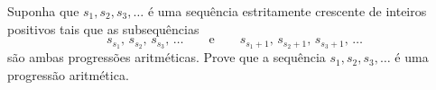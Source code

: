 Suponha que $s_1, s_2, s_3, \ldots$ é uma sequência estritamente crescente de inteiros positivos tais que as subsequências \[s_{s_1},\, s_{s_2},\, s_{s_3},\, \ldots\qquad\text{e}\qquad s_{s_1+1},\, s_{s_2+1},\, s_{s_3+1},\, \ldots\] são ambas progressões aritméticas. Prove que a sequência $ s_1, s_2, s_3, \ldots$ é uma progressão aritmética.
